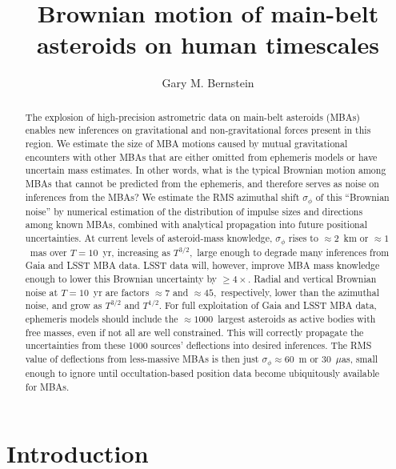 \documentclass[linenumbers, onecolumn]{aastex631}
\begin{document}
\title{Brownian motion of main-belt asteroids on human timescales} 

\author[0000-0002-8613-8259]{Gary M. Bernstein}


\begin{abstract}
  The explosion of high-precision astrometric data on main-belt
  asteroids (MBAs) enables new
  inferences on gravitational and non-gravitational forces present in
  this region.  We estimate the size of MBA motions
  caused by mutual gravitational encounters with other MBAs that are
  either omitted from ephemeris models or have uncertain mass
  estimates. In other words, what is the typical Brownian motion among
  MBAs that cannot be predicted from the ephemeris, and therefore
  serves as noise on inferences from the MBAs?  We estimate the RMS
  azimuthal shift $\sigma_\phi$ of this ``Brownian noise''  by
  numerical estimation of the distribution of impulse sizes and
  directions among known MBAs, combined with analytical propagation
  into future positional uncertainties. At current
  levels of asteroid-mass knowledge, $\sigma_\phi$ rises to
  $\approx2$~km or $\approx1$~mas over $T=10$~yr, increasing as
  $T^{3/2},$  large enough to degrade many inferences from
  Gaia and LSST MBA data. LSST data will, however, improve MBA
  mass knowledge enough to lower this Brownian uncertainty by
  $\ge4\times.$  Radial and vertical Brownian noise  at $T=10$~yr are
  factors $\approx7$ and $\approx45,$ respectively,
  lower than the azimuthal noise, and grow as $T^{3/2}$
  and $T^{1/2}.$  For full exploitation of Gaia and
  LSST MBA data, ephemeris models should include the
  $\approx1000$~largest asteroids as active bodies with free masses,
  even if not all are well constrained.  This will correctly propagate
  the uncertainties from these 1000 sources' deflections into desired
  inferences. The RMS value of deflections from less-massive MBAs is
  then just $\sigma_\phi\approx60$~m or 30~$\mu$as, small enough to ignore until occultation-based position data become ubiquitously available for MBAs.
\end{abstract}


\section{Introduction}
\end{document}
